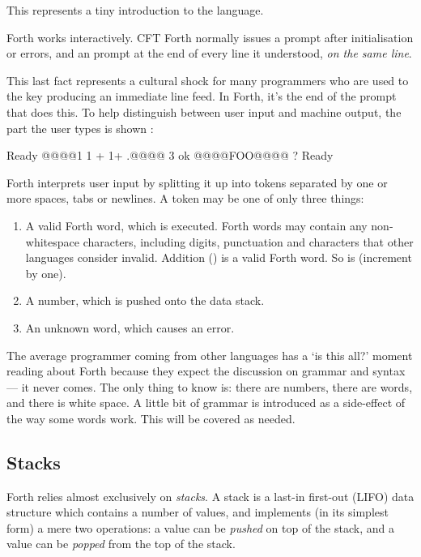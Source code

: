 This represents a tiny introduction to the language.

Forth works interactively. CFT Forth normally issues a  prompt
after initialisation or errors, and an  prompt at the end of every
line it understood, {\em on the same line}.

This last fact represents a cultural shock for many programmers who are used to
the  key producing an immediate line feed. In Forth, it's the end
of the  prompt that does this. To help distinguish between user
input and machine output, the part the user types is shown
:

\begin{intrcode}
Ready
@@@@1 1 + 1+ .@@@@ 3 ok
@@@@FOO@@@@  ? Ready
\end{intrcode}

\noindent Forth interprets user input by splitting it up into tokens separated
by one or more spaces, tabs or newlines. A token may be one of only
three things:

\begin{enumerate}
\item A valid Forth word, which is executed. Forth words may contain
  any non-whitespace characters, including digits, punctuation and
  characters that other languages consider invalid. Addition (\fw{+})
  is a valid Forth word. So is  (increment by one).
\item A number, which is pushed onto the \gls{data stack}.
\item An unknown word, which causes an error.
\end{enumerate}

The average programmer coming from other languages has a ‘is this all?’ moment
reading about Forth because they expect the discussion on grammar and syntax —
it never comes. The only thing to know is: there are numbers, there are words,
and there is white space. A little bit of grammar is introduced as a
side-effect of the way some words work. This will be covered as needed.

\subsection{Stacks}

Forth relies almost exclusively on {\em stacks}. A stack is a last-in first-out
(LIFO) data structure which contains a number of values, and implements (in its
simplest form) a mere two operations: a value can be {\em pushed\/} on top of
the stack, and a value can be {\em popped\/} from the top of the stack.

